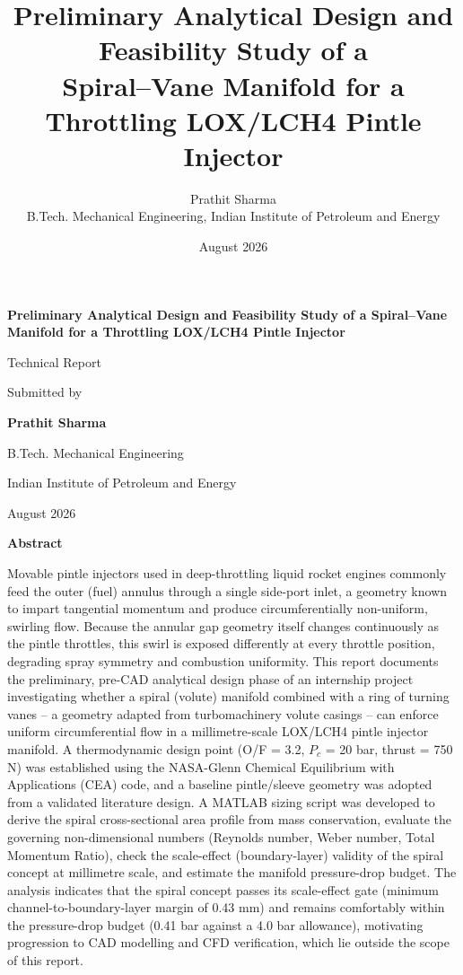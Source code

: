 \documentclass[11pt,a4paper]{article}
\title{\textbf{Preliminary Analytical Design and Feasibility Study of a\\
Spiral--Vane Manifold for a Throttling LOX/LCH4 Pintle Injector}}
\author{Prathit Sharma \\ \small B.Tech. Mechanical Engineering, Indian Institute of Petroleum and Energy}
\date{August 2026}
\begin{document}
\begin{titlepage}
\centering
\vspace*{2cm}
{\Huge\bfseries Preliminary Analytical Design and Feasibility Study of a Spiral--Vane Manifold for a Throttling LOX/LCH4 Pintle Injector\par}
\vspace{2cm}
{\Large Technical Report\par}
\vspace{1.5cm}
{\large Submitted by\par}
\vspace{0.3cm}
{\Large\bfseries Prathit Sharma\par}
\vspace{0.3cm}
{\large B.Tech. Mechanical Engineering\par}
{\large Indian Institute of Petroleum and Energy\par}
\vspace{2cm}
{\large August 2026\par}
\vfill
\end{titlepage}


\begin{center}
{\Large\bfseries Abstract\par}
\end{center}
\vspace{0.4cm}
\noindent
Movable pintle injectors used in deep-throttling liquid rocket engines commonly feed the outer (fuel) annulus through a single side-port inlet, a geometry known to impart tangential momentum and produce circumferentially non-uniform, swirling flow. Because the annular gap geometry itself changes continuously as the pintle throttles, this swirl is exposed differently at every throttle position, degrading spray symmetry and combustion uniformity. This report documents the preliminary, pre-CAD analytical design phase of an internship project investigating whether a spiral (volute) manifold combined with a ring of turning vanes -- a geometry adapted from turbomachinery volute casings -- can enforce uniform circumferential flow in a millimetre-scale LOX/LCH4 pintle injector manifold. A thermodynamic design point (O/F = 3.2, $P_c$ = 20 bar, thrust = 750 N) was established using the NASA-Glenn Chemical Equilibrium with Applications (CEA) code, and a baseline pintle/sleeve geometry was adopted from a validated literature design. A MATLAB sizing script was developed to derive the spiral cross-sectional area profile from mass conservation, evaluate the governing non-dimensional numbers (Reynolds number, Weber number, Total Momentum Ratio), check the scale-effect (boundary-layer) validity of the spiral concept at millimetre scale, and estimate the manifold pressure-drop budget. The analysis indicates that the spiral concept passes its scale-effect gate (minimum channel-to-boundary-layer margin of 0.43 mm) and remains comfortably within the pressure-drop budget (0.41 bar against a 4.0 bar allowance), motivating progression to CAD modelling and CFD verification, which lie outside the scope of this report.
\end{document}
